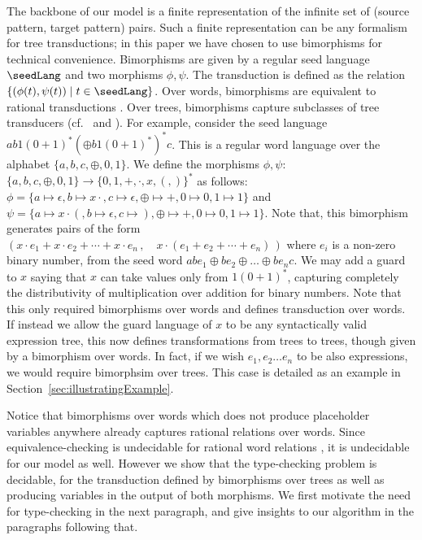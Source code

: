 The backbone of our model is a finite representation of the infinite set of (source pattern, target pattern) pairs. Such a finite representation can be any formalism for tree transductions; in this paper we have chosen to use bimorphisms for technical convenience. Bimorphisms are given by a regular seed language $\seedLang$ and two morphisms $\phi, \psi$. The transduction is defined as the relation $\{(\phi(t), \psi(t)) \mid t \in \seedLang\}$. Over words, bimorphisms are equivalent to rational transductions \cite{Nivat68}. Over trees, bimorphisms capture subclasses of tree transducers (cf.~\cite[Section 6.5]{tata} and \cite{Engelfriet75}).
For example, consider the seed language   $a b 1(0+1)^\ast (\oplus b 1(0+1)^\ast)^\ast c$. This is a regular word language over the alphabet $\{a, b, c, \oplus, 0, 1\}$. We define the morphisms $\phi, \psi$: $\{a, b, c, \oplus, 0, 1\} \to \{0,1, +, \cdot, x, (, ) \}^\ast$  as follows: $\phi= \{a \mapsto \epsilon, b \mapsto x \cdot {}, c \mapsto \epsilon, \oplus \mapsto +, 0 \mapsto 0, 1 \mapsto 1\}$ and $\psi= \{a \mapsto x \cdot (, b \mapsto \epsilon, c \mapsto ), \oplus \mapsto +, 0 \mapsto 0, 1 \mapsto 1\}$. Note that, this bimorphism generates pairs of the form $(x \cdot e_1 + x\cdot e_2 + \cdots + x\cdot e_n\,, \quad 
x\cdot (e_1 + e_2 + \cdots + e_n)\,)$ where $e_i$ is a non-zero binary
number, from the seed word $a b e_1 \oplus b e_2 \oplus \dots \oplus b
e_n c$. We may add a guard to $x$ saying that $x$ can take values only
from $1(0+1)^\ast$, capturing completely the distributivity of
multiplication over addition for binary numbers. Note that this only
required bimorphisms over words and defines transduction over words.
If instead we allow the guard language of $x$ to be any syntactically
valid expression tree, this now defines transformations from trees to
trees, though given by a bimorphism over words. In fact, if we wish
$e_1, e_2 \dots e_n$ to be also expressions, we would require
bimorphsim over trees. This case is detailed as an example in
Section~\ref{sec:illustratingExample}.%

 Notice that bimorphisms over words which does not produce placeholder variables anywhere already captures rational relations over words. Since equivalence-checking is undecidable for rational word relations
\cite{FR1968, Griffiths1968}, it is undecidable for our model as well. However
we show that the type-checking problem is decidable, for the transduction defined by bimorphisms over trees as well as producing variables in the output of both morphisms.  We first motivate the need for type-checking in the next paragraph, and give insights to our algorithm in the paragraphs following that. 

